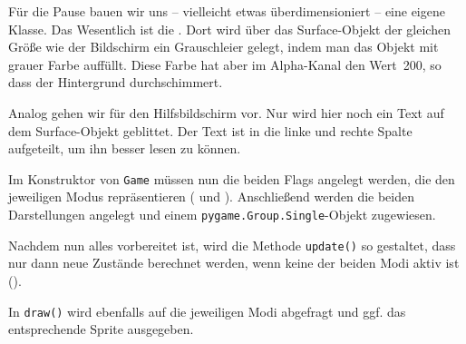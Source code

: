 Für die Pause bauen wir uns -- vielleicht etwas überdimensioniert -- eine eigene Klasse. Das Wesentlich ist die . Dort wird über das Surface-Objekt der gleichen Größe wie der Bildschirm ein Grauschleier gelegt, indem man das Objekt mit grauer Farbe auffüllt. Diese Farbe hat aber im Alpha-Kanal den Wert~200, so dass der Hintergrund durchschimmert.


Analog gehen wir für den Hilfsbildschirm vor. Nur wird hier noch ein Text auf dem Surface-Objekt geblittet. Der Text ist in die linke und rechte Spalte aufgeteilt, um ihn besser lesen zu können. 


Im Konstruktor von \texttt{Game} müssen nun die beiden Flags angelegt werden, die den jeweiligen Modus repräsentieren ( und ). Anschließend werden die beiden Darstellungen angelegt und einem \texttt{pygame.Group.Single}-Objekt zugewiesen.


Nachdem nun alles vorbereitet ist, wird die Methode \texttt{update()} so gestaltet, dass nur dann neue Zustände berechnet werden, wenn keine der beiden Modi aktiv ist ().



In \texttt{draw()} wird ebenfalls auf die jeweiligen Modi abgefragt und ggf. das entsprechende Sprite ausgegeben.





